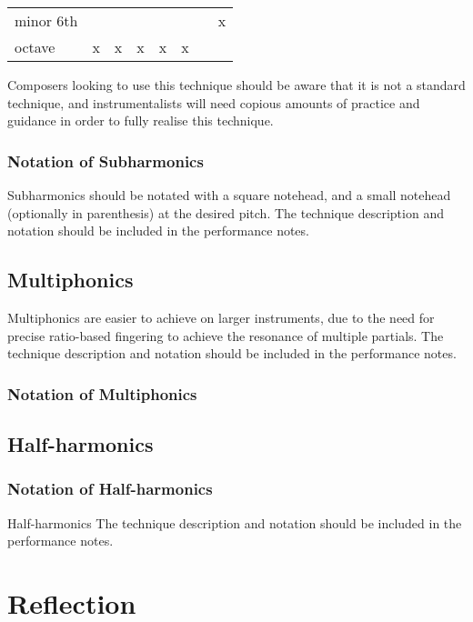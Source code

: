 \begin{table}[]
{\begin{tabular}{llllllll}
    minor 6th                                                                                             &                         &                       &                       &                       &                       &                       & x                     \\
    octave                                                                                                & x                       & x                     & x                     & x                     & x                     &                       &                      
    \end{tabular}%
    }
    \end{table}

Composers looking to use this technique should be aware that it is not a standard technique, and instrumentalists will need copious amounts of practice and guidance in order to fully realise this technique.

\subsubsection{Notation of Subharmonics}
Subharmonics should be notated with a square notehead, and a small notehead (optionally in parenthesis) at the desired pitch.
The technique description and notation should be included in the performance notes.

\subsection{Multiphonics}
Multiphonics are easier to achieve on larger instruments, due to the need for precise ratio-based fingering to achieve the resonance of multiple partials.
The technique description and notation should be included in the performance notes.
\lipsum[4]

\subsubsection{Notation of Multiphonics}

\subsection{Half-harmonics}

\subsubsection{Notation of Half-harmonics}
Half-harmonics 
The technique description and notation should be included in the performance notes.

\section{Reflection}




\lipsum[4]